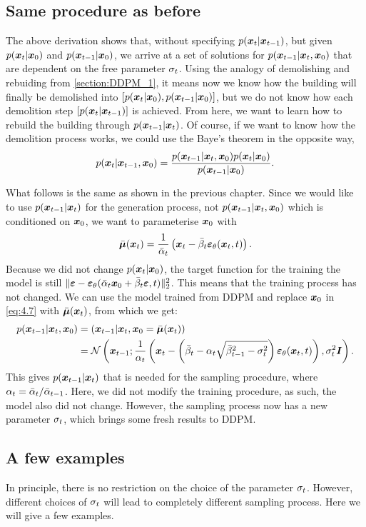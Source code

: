 \subsection{Same procedure as before}
The above derivation shows that, without specifying $p(\bm{x}_{t}|\bm{x}_{t-1})$, but given $p(\bm{x}_{t}|\bm{x}_0)$ and $p(\bm{x}_{t-1}|\bm{x}_0)$, we arrive at a set of solutions for $p(\bm{x}_{t-1}|\bm{x}_{t},\bm{x}_0)$ that are dependent on the free parameter $\sigma_t$. Using the analogy of demolishing and rebuiding from \cref{section:DDPM_1}, it means now we know how the building will finally be demolished into $[p(\bm{x}_{t}|\bm{x}_0),p(\bm{x}_{t-1}|\bm{x}_0)]$, but we do not know how each demolition step $[p(\bm{x}_{t}|\bm{x}_{t-1})]$ is achieved. From here, we want to learn how to rebuild the building through $p(\bm{x}_{t-1}|\bm{x}_{t})$. Of course, if we  want to know how the demolition process works, we could use the Baye's theorem in the opposite way,
\begin{equation}
    \label{eq:4.8}
    p(\bm{x}_{t}|\bm{x}_{t-1},\bm{x}_0)=\frac{p(\bm{x}_{t-1}|\bm{x}_{t},\bm{x}_0)p(\bm{x}_{t}|\bm{x}_0)}{p(\bm{x}_{t-1}|\bm{x}_0)}.
\end{equation}

What follows is the same as shown in the previous chapter. Since we would like to use $p(\bm{x}_{t-1}|\bm{x}_{t})$ for the generation process, not $p(\bm{x}_{t-1}|\bm{x}_{t},\bm{x}_0)$ which is conditioned on $\bm{x}_0$, we want to parameterise $\bm{x}_0$ with 
\begin{equation}
    \label{eq:4.9}
    \bar{\bm{\mu}}(\bm{x}_{t})=\frac{1}{\bar{\alpha}_t}\left(\bm{x}_{t}-\bar{\beta}_t\bm{\varepsilon}_\theta(\bm{x}_{t},t)  \right).
\end{equation}
Because we did not change $p(\bm{x}_{t}|\bm{x}_0)$,  the target function for the training the model is still $\|\bm{\varepsilon}-\bm{\varepsilon}_\theta(\bar{\alpha}_t\bm{x}_0+\bar{\beta}_t\bm{\varepsilon},t) \|_2^2$. This means that the training process has not changed. We can use the model trained from DDPM and replace $\bm{x}_0$ in \cref{eq:4.7} with $\bar{\bm{\mu}}(\bm{x}_{t})$, from which we get:
\begin{align}
    p(\bm{x}_{t-1}|\bm{x}_{t},\bm{x}_0)&=(\bm{x}_{t-1}|\bm{x}_{t},\bm{x}_0=\bar{\bm{\mu}}(\bm{x}_{t}))\nonumber\\
   &=\mathcal{N}\left(\bm{x}_{t-1}; \frac{1}{\alpha_t}\left(\bm{x}_{t}-\left( \bar{\beta}_t-\alpha_t\sqrt{\bar{\beta}_{t-1}^2-\sigma_t^2}
\right)\bm{\varepsilon}_\theta(\bm{x}_{t},t)\right) ,\sigma_t^2\bm{I}\right). \label{eq:4.10}
\end{align}
This gives $p(\bm{x}_{t-1}|\bm{x}_{t})$ that is needed for the sampling procedure, where $\alpha_t=\bar{\alpha}_t/\bar{\alpha}_{t-1}$. Here, we did not modify the training procedure, as such, the model also did not change. However, the sampling process now has a new parameter $\sigma_t$, which brings some fresh results to DDPM.

\subsection{A few examples}
In principle, there is no restriction on the choice of the parameter $\sigma_t$. However, different choices of $\sigma_t$ will lead to completely different sampling process. Here we will give a few examples.


